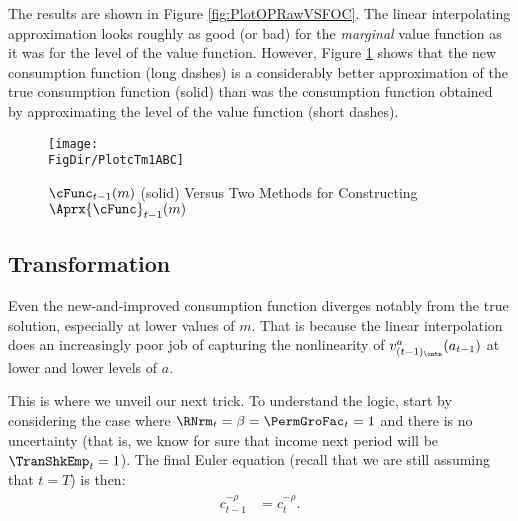 
The results are shown in Figure \ref{fig:PlotOPRawVSFOC}.  The linear interpolating approximation looks roughly as good (or bad) for the \textit{marginal} value function as it was for the level of the value function. However, Figure \ref{fig:PlotcTm1ABC} shows that the new consumption function (long dashes) is a considerably better approximation of the true consumption function (solid) than was the consumption function obtained by approximating the level of the value function (short dashes).

\hypertarget{PlotcTm1ABC}{}
\begin{figure}
  \centerline{\texttt{[image: \\FigDir/PlotcTm1ABC]}}
  \caption{$\cFunc_{t-1}(m)$ (solid) Versus Two Methods for Constructing $\Aprx{\cFunc}_{t-1}(m)$}
  \label{fig:PlotcTm1ABC}
\end{figure}

\hypertarget{transformation}{}
\subsection{Transformation}\label{subsec:transformation}

Even the new-and-improved consumption function diverges notably from the true
solution, especially at lower values of $m$.  That is because the
linear interpolation does an increasingly poor job of capturing the
nonlinearity of $v_{(t-1)_\cntn}^{a}(a_{t-1})$ at
lower and lower levels of $a$.

This is where we unveil our next trick.  To understand the logic,
start by considering the case where $\RNrm_{t} = \beta =
\PermGroFac_{t} = 1$ and there is no uncertainty
(that is, we know for sure that income next period
will be $\TranShkEmp_{t} = 1$).  The final Euler equation (recall that we are still assuming that $t=T$) is then:
\begin{equation}\begin{gathered}\begin{aligned}
      c_{t-1}^{-\rho}  & = c_{t}^{-\rho}.
    \end{aligned}\end{gathered}\end{equation}

